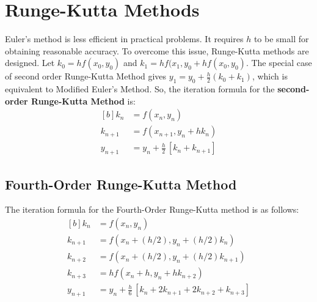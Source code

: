 \documentclass[aima203_lecturenotes_ku.tex]{subfiles}
\begin{document}
\section{Runge-Kutta Methods}
Euler's method is less efficient in practical problems. It requires $h$ to be small for obtaining reasonable accuracy. To overcome this issue, Runge-Kutta methods are designed.
Let $k_0 =hf(x_0,y_0)$ and $k_1 = hf(x_1, y_0 + hf(x_0,y_0)$. The special case of second order Runge-Kutta Method gives $\displaystyle y_1 = y_0 + \frac{h}{2}(k_0 + k_1)$, which is equivalent to Modified Euler's Method. So, the iteration formula for the \textbf{second-order Runge-Kutta Method} is:
\begin{equation}
  \label{rungesecond}
  \begin{aligned}[b]
    k_n &= f(x_n,y_n) \\[1mm]
    k_{n+1} &= f(x_{n+1},y_n + hk_n) \\[1mm]
    y_{n+1} &= y_n + \frac{h}{2} \,\left [ k_n + k_{n+1} \right ]
  \end{aligned}
\end{equation}

\subsection{Fourth-Order Runge-Kutta Method}
The iteration formula for the Fourth-Order Runge-Kutta method is as follows:
\begin{equation}
  \label{rungefourth}
  \begin{aligned}[b]
    k_n &= f(x_n,y_n) \\[1mm]
    k_{n+1} &= f(x_n +(h/2) ,y_n + (h/2)k_n) \\[1mm]
    k_{n+2} &= f(x_n +(h/2) ,y_n + (h/2)k_{n+1}) \\[1mm]
    k_{n+3} &= hf(x_n + h ,y_n + hk_{n+2}) \\[1mm]
    y_{n+1} &= y_n + \frac{h}{6} \,\left [k_n + 2k_{n+1} + 2k_{n+2} + k_{n+3}\right ]
  \end{aligned}
\end{equation}
\end{document}
